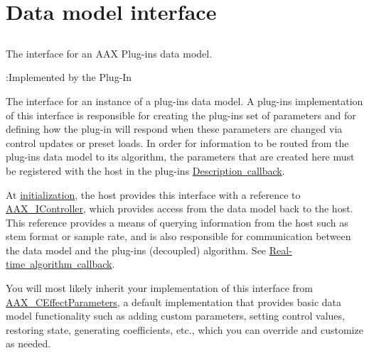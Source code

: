 \hypertarget{a00798}{}\section{Data model interface}
\label{a00798}


\subsection{ }
The interface for an A\+AX Plug-\/in\textquotesingle{}s data model. 

\begin{DoxyRefDesc}{\+:\+Implemented by the Plug-\/\+In}
\item[\mbox{\hyperlink{a00791__aax_plugin_implementation000003}{\+:\+Implemented by the Plug-\/\+In}}]\end{DoxyRefDesc}


The interface for an instance of a plug-\/in\textquotesingle{}s data model. A plug-\/in\textquotesingle{}s implementation of this interface is responsible for creating the plug-\/in\textquotesingle{}s set of parameters and for defining how the plug-\/in will respond when these parameters are changed via control updates or preset loads. In order for information to be routed from the plug-\/in\textquotesingle{}s data model to its algorithm, the parameters that are created here must be registered with the host in the plug-\/in\textquotesingle{}s \mbox{\hyperlink{a00796}{Description callback}}.

At \mbox{\hyperlink{a01669_ad4db3c0ab67f8f41cdd042a915daabb4}{initialization}}, the host provides this interface with a reference to \mbox{\hyperlink{a01789}{A\+A\+X\+\_\+\+I\+Controller}}, which provides access from the data model back to the host. This reference provides a means of querying information from the host such as stem format or sample rate, and is also responsible for communication between the data model and the plug-\/in\textquotesingle{}s (decoupled) algorithm. See \mbox{\hyperlink{a00797}{Real-\/time algorithm callback}}.

You will most likely inherit your implementation of this interface from \mbox{\hyperlink{a01481}{A\+A\+X\+\_\+\+C\+Effect\+Parameters}}, a default implementation that provides basic data model functionality such as adding custom parameters, setting control values, restoring state, generating coefficients, etc., which you can override and customize as needed.

